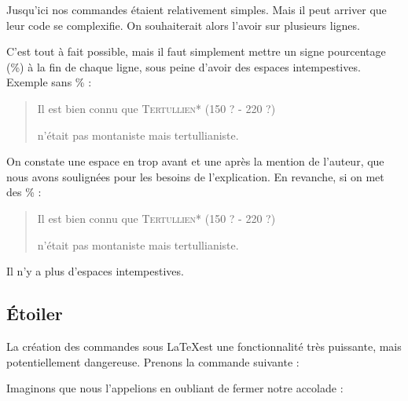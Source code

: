 Jusqu'ici nos commandes étaient relativement simples. Mais il peut arriver que leur code se complexifie. On souhaiterait alors l'avoir sur plusieurs lignes.

C'est tout à fait possible, mais il faut simplement mettre  un signe pourcentage (\%) à la fin de chaque ligne, sous peine d'avoir  des espaces intempestives. Exemple sans  \% :

\begin{latexcode}
\newcommand{\auteur}[2]{
    \textsc{#1}* (#2)
    }
\end{latexcode}

\renewcommand{\auteur}[2]{\underline{ }%
    \textsc{#1}* (#2)\underline{ }%
}

\begin{quotation}
Il est bien connu que \auteur{Tertullien}{150 ? - 220 ?}
n'était pas montaniste mais tertullianiste.
\end{quotation}

On constate une espace en trop avant et une après la mention de l'auteur, que nous avons soulignées pour les besoins de l'explication.
En revanche, si on met des \% :

\begin{latexcode}
\newcommand{\auteur}[2]{%
    \textsc{#1}* (#2)%
    }
\end{latexcode}

\renewcommand{\auteur}[2]{%
    \textsc{#1}* (#2)%
}

\begin{quotation}
Il est bien connu que \auteur{Tertullien}{150 ? - 220 ?}
n'était pas montaniste mais tertullianiste.
\end{quotation}

Il n'y a plus d'espaces intempestives.


\subsection{Étoiler }

La création des commandes sous \LaTeX est une fonctionnalité très puissante, mais potentiellement dangereuse. Prenons la commande suivante :

\begin{latexcode}
\newcommand{\auteur}[1]{\textsc{#1}*}
\end{latexcode}

Imaginons que nous l'appelions en oubliant de fermer notre accolade :

\begin{latexcode}
Il est bien connu que \auteur{Tertullien n'était pas montaniste
 mais tertullianiste.
\end{latexcode}

